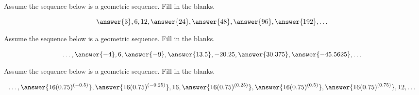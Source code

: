 \documentclass[nooutcomes]{ximera}
\begin{document}
\begin{problem}
Assume the sequence below is a geometric sequence.  Fill in the blanks.

\[
\answer{3}, 6, 12, \answer{24}, \answer{48}, \answer{96}, \answer{192}, \dots
\]

\end{problem}




\begin{problem}
Assume the sequence below is a geometric sequence.  Fill in the blanks.

\[
\dots, \answer{-4}, 6, \answer{-9}, \answer{13.5}, -20.25, \answer{30.375}, \answer{-45.5625}, \dots
\]

\end{problem}




\begin{problem}
Assume the sequence below is a geometric sequence.  Fill in the blanks.

\[
\dots, \answer{16(0.75)^{(-0.5)}}, \answer{16(0.75)^{(-0.25)}}, 16, \answer{16(0.75)^{(0.25)}}, \answer{16(0.75)^{(0.5)}}, \answer{16(0.75)^{(0.75)}}, 12, \dots
\]

\end{problem}
\end{document}
